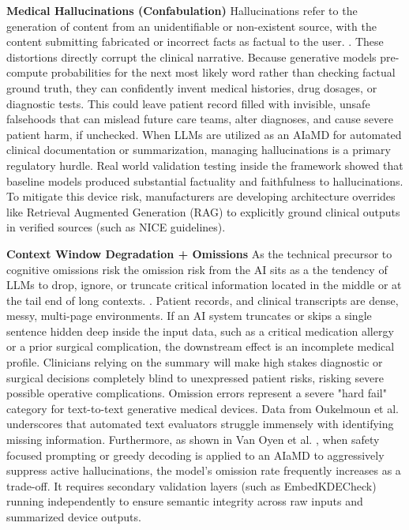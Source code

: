 \documentclass[11pt,a4paper]{article}
\begin{document}
\textbf{Medical Hallucinations (Confabulation)}
Hallucinations refer to the generation of content from an unidentifiable or non-existent source, with the content submitting fabricated or incorrect facts as factual to the user. \cite{guan2026} . These distortions directly corrupt the clinical narrative. Because generative models pre-compute probabilities for the next most likely word rather than checking factual ground truth, they can confidently invent medical histories, drug dosages, or diagnostic tests. This could leave patient record filled with invisible, unsafe falsehoods that can mislead future care teams, alter diagnoses, and cause severe patient harm, if unchecked.
When LLMs are utilized as an AIaMD for automated clinical documentation or summarization, managing hallucinations is a primary regulatory hurdle. Real world validation testing inside the \cite{mhra2025} framework showed that baseline models produced substantial factuality and faithfulness to hallucinations. To mitigate this device risk, manufacturers are developing architecture overrides like Retrieval Augmented Generation (RAG) to explicitly ground clinical outputs in verified sources (such as NICE guidelines).

\textbf{Context Window Degradation + Omissions}
As the technical precursor to cognitive omissions risk the omission risk from the AI sits as a the tendency of LLMs to drop, ignore, or truncate critical information located in the middle or at the tail end of long contexts. \cite{mhra2025} .
Patient records, and clinical transcripts  are dense, messy,  multi-page environments. If an AI system truncates or skips a single sentence hidden deep inside the input data, such as a critical medication allergy or a prior surgical complication, the downstream effect is an incomplete medical profile. Clinicians relying on the summary will make high stakes diagnostic or surgical decisions completely blind to unexpressed patient risks, risking severe possible operative complications.
Omission errors represent a severe "hard fail" category for text-to-text generative medical devices. Data from Oukelmoun et al. \cite{oUKelmoun2025} underscores that automated text evaluators struggle immensely with identifying missing information. Furthermore, as shown in Van Oyen et al. \cite{vanoyen2026} , when safety focused prompting or greedy decoding is applied to an AIaMD to aggressively suppress active hallucinations, the model's omission rate frequently increases as a trade-off. It requires secondary validation layers (such as EmbedKDECheck) running independently to ensure semantic integrity across raw inputs and summarized device outputs.
\end{document}
